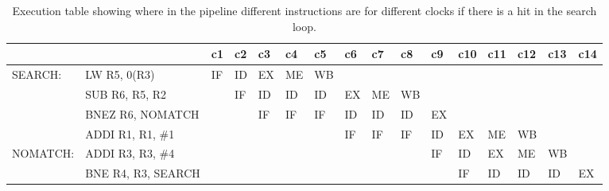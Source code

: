 \begin{landscape}
    \begin{table}[]
    \centering
    \begin{tabular}{llllllllllllllll}
    \hline
             &                                         & c1 & c2 & c3 & c4 & c5 & c6 & c7 & c8 & c9 & c10 & c11 & c12 & c13 & c14 \\ \hline
    SEARCH:  & \multicolumn{1}{l|}{LW R5, 0(R3)}       & IF & ID & EX & ME & WB &    &    &    &    &     &     &     &     &     \\
             & \multicolumn{1}{l|}{SUB R6, R5, R2}     &    & IF & ID & ID & ID & EX & ME & WB &    &     &     &     &     &     \\
             & \multicolumn{1}{l|}{BNEZ R6, NOMATCH}   &    &    & IF & IF & IF & ID & ID & ID & EX &     &     &     &     &     \\
             & \multicolumn{1}{l|}{ADDI R1, R1, \#1}   &    &    &    &    &    & IF & IF & IF & ID & EX  & ME  & WB  &     &     \\
    NOMATCH: & \multicolumn{1}{l|}{ADDI R3, R3, \#4}   &    &    &    &    &    &    &    &    & IF & ID  & EX  & ME  & WB  &     \\
             & \multicolumn{1}{l|}{BNE R4, R3, SEARCH} &    &    &    &    &    &    &    &    &    & IF  & ID  & ID  & ID  & EX  \\ \hline
    \end{tabular}
    \caption{Execution table showing where in the pipeline different instructions are for different clocks if there is a hit in the search loop.}
    \label{tab:t21bhit}
    \end{table}


\end{landscape}
